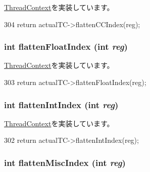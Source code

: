 \hyperlink{classThreadContext_aedffeaa2c4a155d5916a2ae379d77a51}{ThreadContext}を実装しています。


\begin{DoxyCode}
304 { return actualTC->flattenCCIndex(reg); }
\end{DoxyCode}
\hypertarget{classCheckerThreadContext_ab9ea3f8f1a21df875c7273c7377dfac1}{
\subsubsection[{flattenFloatIndex}]{\setlength{\rightskip}{0pt plus 5cm}int flattenFloatIndex (int {\em reg})}}
\label{classCheckerThreadContext_ab9ea3f8f1a21df875c7273c7377dfac1}


\hyperlink{classThreadContext_a7176627444d21b2734a0855b67e6aacf}{ThreadContext}を実装しています。


\begin{DoxyCode}
303 { return actualTC->flattenFloatIndex(reg); }
\end{DoxyCode}
\hypertarget{classCheckerThreadContext_aa529f2d70520c578e3e29b3bf1a66312}{
\subsubsection[{flattenIntIndex}]{\setlength{\rightskip}{0pt plus 5cm}int flattenIntIndex (int {\em reg})}}
\label{classCheckerThreadContext_aa529f2d70520c578e3e29b3bf1a66312}


\hyperlink{classThreadContext_a6940c379416884cb0b9eb04c5193580e}{ThreadContext}を実装しています。


\begin{DoxyCode}
302 { return actualTC->flattenIntIndex(reg); }
\end{DoxyCode}
\hypertarget{classCheckerThreadContext_a5adc7d32f3a8bd75c5dc0a62d95564fd}{
\subsubsection[{flattenMiscIndex}]{\setlength{\rightskip}{0pt plus 5cm}int flattenMiscIndex (int {\em reg})}}
\label{classCheckerThreadContext_a5adc7d32f3a8bd75c5dc0a62d95564fd}


